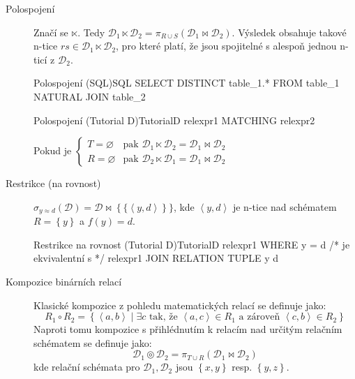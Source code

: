 \begin{description}
\item[Polospojení] Značí se $\ltimes$. Tedy $\mathcal{D}_{1} \ltimes \mathcal{D}_{2} = \pi_{R \cup S} (\mathcal{D}_{1} \Join \mathcal{D}_{2})$. Výsledek obsahuje takové n-tice $rs \in \mathcal{D}_{1} \ltimes \mathcal{D}_{2}$, pro které platí, že jsou spojitelné s alespoň jednou n-ticí z $\mathcal{D}_{2}$.
\begin{upcode}{Polospojení (SQL)}{}{SQL}
SELECT DISTINCT table_1.* FROM table_1 NATURAL JOIN table_2
\end{upcode}
\begin{upcode}{Polospojení (Tutorial D)}{}{TutorialD}
relexpr1 MATCHING relexpr2
\end{upcode}
Pokud je $\left\{\!\!\!
\begin{array}{ll}
T = \varnothing & \text{pak } \mathcal{D}_{1} \ltimes \mathcal{D}_{2} = \mathcal{D}_{1} \Join \mathcal{D}_{2} \\
R = \varnothing & \text{pak } \mathcal{D}_{2} \ltimes \mathcal{D}_{1} = \mathcal{D}_{1} \Join \mathcal{D}_{2}
\end{array}\right.$

\item[Restrikce (na rovnost)] $\sigma_{y \approx d} (\mathcal{D}) = \mathcal{D} \Join \left\{\{ \left\langle y, d \right\rangle \right\}\} $, kde $\left\langle y, d \right\rangle$ je n-tice nad schématem $R = \left\{ y \right\}$ a $f(y) = d$.
\begin{upcode}{Restrikce na rovnost (Tutorial D)}{}{TutorialD}
relexpr1 WHERE y = d
/* je ekvivalentní s */
relexpr1 JOIN RELATION {TUPLE {y d}}
\end{upcode}

\item[Kompozice binárních relací] Klasické kompozice z pohledu matematických relací se definuje jako:
$$
R_{1} \circ R_{2} = \left\{ \left\langle a, b \right\rangle \; | \; \exists c \text{ tak, že } \left\langle a, c \right\rangle \in R_{1} \text{ a zároveň } \left\langle c, b \right\rangle \in R_{2} \right\}
$$
Naproti tomu kompozice s přihlédnutím k relacím nad určitým relačním schématem se definuje jako:
$$
\mathcal{D}_{1} \circledcirc \mathcal{D}_{2} = \pi_{T \cup R} (\mathcal{D}_{1} \Join \mathcal{D}_{2})
$$
kde relační schémata pro $\mathcal{D}_{1}, \mathcal{D}_{2}$ jsou $\left\{ x, y \right\}$ resp. $\left\{ y, z \right\}$.

\end{description}
